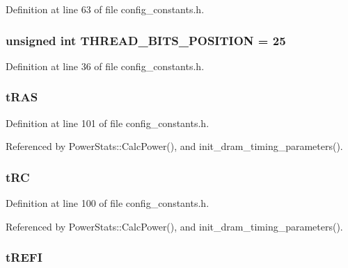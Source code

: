 Definition at line 63 of file config\_\-constants.h.
\subsubsection[{THREAD\_\-BITS\_\-POSITION}]{\setlength{\rightskip}{0pt plus 5cm}unsigned int {\bf THREAD\_\-BITS\_\-POSITION} = 25}\label{config__constants_8h_581f0c063e972c5f202149f2e3ce7452}




Definition at line 36 of file config\_\-constants.h.
\subsubsection[{tRAS}]{ {\bf tRAS}}\label{config__constants_8h_b04341bc974da754ab3203d08630dabc}




Definition at line 101 of file config\_\-constants.h.

Referenced by PowerStats::CalcPower(), and init\_\-dram\_\-timing\_\-parameters().
\subsubsection[{tRC}]{ {\bf tRC}}\label{config__constants_8h_92ad454fbec9160710e2dd6f86be41cf}




Definition at line 100 of file config\_\-constants.h.

Referenced by PowerStats::CalcPower(), and init\_\-dram\_\-timing\_\-parameters().
\subsubsection[{tREFI}]{ {\bf tREFI}}\label{config__constants_8h_550ce21a84e96942a1d99b608a582221}




